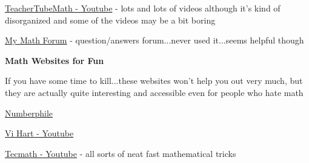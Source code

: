 \documentclass[12pt]{article}
\begin{document}
\href{https://www.youtube.com/user/teachertubemath/featured}{TeacherTubeMath - Youtube} - lots and lots of videos although it's kind of disorganized and some of the videos may be a bit boring

\href{http://mymathforum.com/}{My Math Forum} - question/answers forum...never used it...seems helpful though

\textbf{Math Websites for Fun}

If you have some time to kill...these websites won't help you out very much, but they are actually quite interesting and accessible even for people who hate math

\href{https://www.youtube.com/user/numberphile}{Numberphile}

\href{https://www.youtube.com/user/Vihart/videos}{Vi Hart - Youtube } 

\href{https://www.youtube.com/user/tecmath}{Tecmath - Youtube} - all sorts of neat fast mathematical tricks
\end{document}
